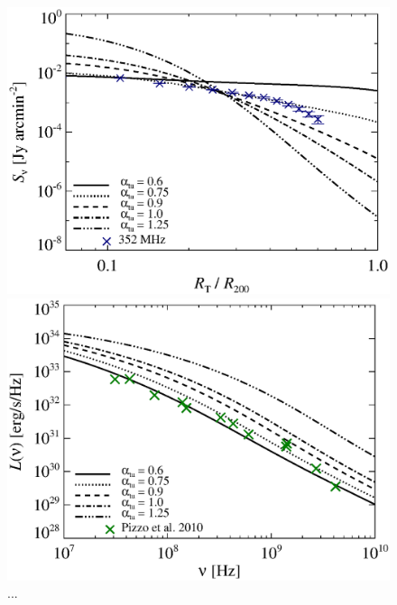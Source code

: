 \documentclass[a4paper,fleqn,usenatbib]{mnras}
\newcommand{\Mflatturb}{{\it M-turbulence}\xspace}
\begin{document}
\begin{figure}
\begin{minipage}{1\columnwidth}
\begin{center}
   \end{center}
\end{minipage}
\\
\begin{minipage}{1\columnwidth}
  \begin{center}%
    \includegraphics[width=\columnwidth]{prof.comp.KrTTDth.aI0.eps}
  \end{center}
\end{minipage}
\begin{minipage}{1\columnwidth}
   \begin{center}%
     \includegraphics[width=\columnwidth]{spec.comp.KrTTDth.aI0.eps}
   \end{center}
\end{minipage}
\caption{...}
  \label{fig:param_comp}
\end{figure}
\end{document}
